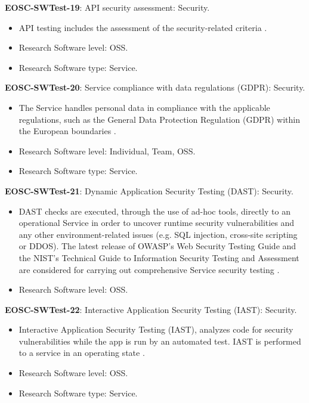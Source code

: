 \textbf{EOSC-SWTest-19}: API security assessment: Security.

\begin{itemize}
    \item API testing includes the assessment of the security-related criteria \cite{orviz_fernandez_eosc-synergy_2020}.
    \item Research Software level: OSS.
    \item Research Software type: Service.
\end{itemize}

\textbf{EOSC-SWTest-20}: Service compliance with data regulations (GDPR): Security.

\begin{itemize}
    \item The Service handles personal data in compliance with the applicable regulations, such as the General Data Protection Regulation (GDPR) within the European boundaries \cite{orviz_fernandez_eosc-synergy_2020}.
    \item Research Software level: Individual, Team, OSS.
    \item Research Software type: Service.
\end{itemize}

\textbf{EOSC-SWTest-21}: Dynamic Application Security Testing (DAST): Security.

\begin{itemize}
    \item DAST checks are executed, through the use of ad-hoc tools, directly to an operational Service in order to uncover runtime security vulnerabilities and any other environment-related issues (e.g. SQL injection, cross-site scripting or DDOS). The latest release of OWASP's Web Security Testing Guide and the NIST's Technical Guide to Information Security Testing and Assessment are considered for carrying out comprehensive Service security testing \cite{orviz_fernandez_eosc-synergy_2020}.
    \item Research Software level: OSS.
\end{itemize}

\textbf{EOSC-SWTest-22}: Interactive Application Security Testing (IAST): Security.

\begin{itemize}
    \item Interactive Application Security Testing (IAST), analyzes code for security vulnerabilities while the app is run by an automated test. IAST is performed to a service in an operating state \cite{orviz_fernandez_eosc-synergy_2020}.
    \item Research Software level: OSS.
    \item Research Software type: Service.
\end{itemize}

